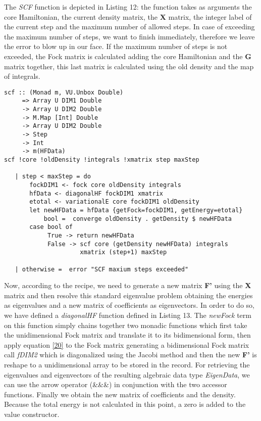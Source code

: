 \documentclass{tmr}
\begin{document}
The \textit{SCF} function is depicted in Listing 12: the function takes as arguments
the core Hamiltonian, the current density matrix, the \textbf{X} matrix, the integer label
of the current step and the maximum number of allowed steps. In case of exceeding
the maximum number of steps, we want to finish immediately, therefore we leave the error
to blow up in our face. If the maximum number of steps is not exceeded, the Fock matrix
is calculated adding the core Hamiltonian and the \textbf{G} matrix together, this last matrix is
calculated using the old density and the map of integrals.

\begin{lstlisting}[float,captionpos=b,belowcaptionskip=4pt, caption= Self Consistent Field Function]   
scf :: (Monad m, VU.Unbox Double)
     => Array U DIM1 Double
     -> Array U DIM2 Double
     -> M.Map [Int] Double
     -> Array U DIM2 Double
     -> Step
     -> Int
     -> m(HFData)
scf !core !oldDensity !integrals !xmatrix step maxStep
                                                                   
   | step < maxStep = do
       fockDIM1 <- fock core oldDensity integrals
       hfData <- diagonalHF fockDIM1 xmatrix
       etotal <- variationalE core fockDIM1 oldDensity
       let newHFData = hfData {getFock=fockDIM1, getEnergy=etotal}
           bool =  converge oldDensity . getDensity $ newHFData
       case bool of
            True -> return newHFData
            False -> scf core (getDensity newHFData) integrals
                     xmatrix (step+1) maxStep

   | otherwise =  error "SCF maxium steps exceeded"

\end{lstlisting}

Now, according to the recipe, we need to generate a new matrix \textbf{F'} using
the \textbf{X} matrix and then resolve this standard eigenvalue problem obtaining
the energies as eigenvalues and a new matrix of coefficients as eigenvectors. In order to
do so, we have defined a \textit{diagonalHF} function defined in Listing 13. The \textit{newFock} 
term on this function simply chains together two monadic functions which first take 
the unidimensional Fock matrix and translate it to its bidimensional form, then apply
equation \eqref{20} to the Fock matrix generating a bidimensional Fock matrix call \textit{fDIM2}
which is diagonalized using the Jacobi method and then the new \textbf{F'} is reshape to
a unidimensional array to be stored in the record. For retrieving the eigenvalues and eigenvectors of
the resulting algebraic data type \textit{EigenData}, we can use the arrow operator (\&\&\&)
 in conjunction with the two accessor functions. Finally we obtain the new matrix of
coefficients and the density. Because the total energy is not calculated in this point,
a zero is added to the value constructor. 
\end{document}
